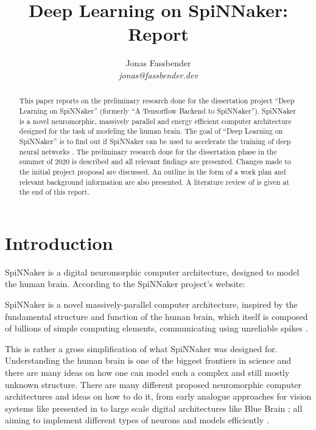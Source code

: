 \documentclass{article}
\begin{document}

\title{Deep Learning on SpiNNaker: Report}
\author{Jonas Fassbender \\ \textit{jonas@fassbender.dev}}
\date{}

\makeEPCCtitle

\newpage

\hspace{0pt}
\vfill

\begin{abstract}
This paper reports on the preliminary research done for the
dissertation project ``Deep Learning on SpiNNaker''
(formerly ``A Tensorflow Backend to SpiNNaker'').
SpiNNaker is a novel neuromorphic, massively parallel and
energy efficient computer architecture designed for the
task of modeling the human brain.
The goal of ``Deep Learning on SpiNNaker'' is to find out
if SpiNNaker can be used to accelerate the training of
deep neural networks \citep[see e.g.][]{goodfellow2016}.
The preliminary research done for the dissertation phase
in the summer of 2020 is described and all relevant
findings are presented.
Changes made to the initial project proposal are discussed.
An outline in the form of a work plan and relevant background
information are also presented.
A literature review of \citet{nita_2018} is given at the
end of this report.
\end{abstract}

\vfill
\hspace{0pt}

\newpage

\tableofcontents

\newpage


\section{Introduction} %
\label{sec:intro}

SpiNNaker is a digital neuromorphic computer architecture,
designed to model the human brain.
According to the SpiNNaker project's website:
\begin{displayquote}
  SpiNNaker is a novel massively-parallel computer
  architecture, inspired by the fundamental structure and
  function of the human brain, which itself is composed of
  billions of simple computing elements, communicating
  using unreliable spikes \citep{spinn_proj}.
\end{displayquote}
This is rather a gross simplification of what SpiNNaker was
designed for.
Understanding the human brain is one of the biggest
frontiers in science and there are many ideas on how one
can model such a complex and still mostly unknown structure.
There are many different proposed neuromorphic computer architectures
and ideas on how to do it, from early analogue approaches for vision
systems like presented in \citet{mead1989} to large scale digital
architectures like Blue Brain \citep{markram2006}; all
aiming to implement different types of neurons and models
efficiently \citep{furber_et_al_2007}.
\end{document}
